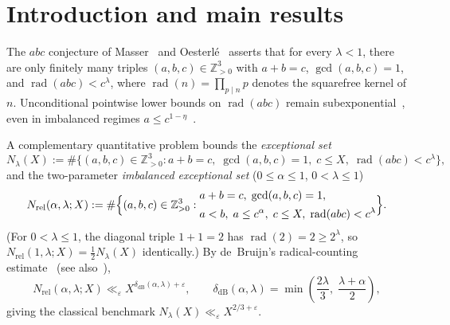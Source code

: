 \documentclass[11pt,a4paper]{amsart}
\theoremstyle{plain}
\theoremstyle{definition}
\theoremstyle{remark}
\DeclareMathOperator{\rad}{rad}
\newcommand{\Z}{\mathbb{Z}}
\newcommand{\eps}{\varepsilon}
\begin{document}
\begin{abstract}
\begin{enumerate}[label=(\arabic*),itemsep=1pt,topsep=2pt]
\[
  N_\lambda(X) \ll_\eps X^{4224/7637 + \eps} \qquad (4224/7637 = 0.553096\ldots).
\]
\end{enumerate}
Finally, we exhibit the exact zero-tail primal extremizer $a_1 a_5^5 + b_1 b_4^4 = c_1 c_3^3 c_4^4$ attaining $4224/7637$ and show why overcoming its $B^1$ pointwise floor requires an averaged bilinear fourth-moment estimate.
\end{abstract}

\maketitle

\section{Introduction and main results}\label{sec:intro}

The $abc$ conjecture of Masser~\cite{Masser1985} and Oesterl\'e~\cite{Oesterle1988} asserts that for every $\lambda < 1$, there are only finitely many triples $(a,b,c) \in \Z_{>0}^3$ with $a+b=c$, $\gcd(a,b,c)=1$, and $\rad(abc) < c^\lambda$, where $\rad(n) = \prod_{p \mid n} p$ denotes the squarefree kernel of $n$. Unconditional pointwise lower bounds on $\rad(abc)$ remain subexponential~\cite{StewartYu2001}, even in imbalanced regimes $a \le c^{1-\eta}$~\cite{Pasten2024}.

A complementary quantitative problem bounds the \emph{exceptional set}
\begin{equation}\label{eq:Nlam}
  N_\lambda(X) := \#\bigl\{(a,b,c) \in \Z_{>0}^3 : a+b=c,\; \gcd(a,b,c)=1,\; c \le X,\; \rad(abc) < c^\lambda\bigr\},
\end{equation}
and the two-parameter \emph{imbalanced exceptional set} ($0 \le \alpha \le 1$, $0 < \lambda \le 1$)
\begin{equation}\label{eq:Nrel}
  N_{\mathrm{rel}}(\alpha,\lambda;X) := \#\Bigl\{(a,b,c) \in \Z_{>0}^3 :
  \begin{aligned}
    &a+b=c,\; \gcd(a,b,c)=1, \\
    &a < b,\; a \le c^\alpha,\; c \le X,\; \rad(abc) < c^\lambda
  \end{aligned}
  \Bigr\}.
\end{equation}
(For $0 < \lambda \le 1$, the diagonal triple $1+1=2$ has $\rad(2) = 2 \ge 2^\lambda$, so $N_{\mathrm{rel}}(1,\lambda;X) = \frac{1}{2} N_\lambda(X)$ identically.) By de~Bruijn's radical-counting estimate~\cite{deBruijn1962} (see also~\cite{Lichtman2025}),
\[
  N_{\mathrm{rel}}(\alpha,\lambda;X) \ll_\eps X^{\delta_{\mathrm{dB}}(\alpha,\lambda)+\eps}, \qquad
  \delta_{\mathrm{dB}}(\alpha,\lambda) = \min\!\left(\frac{2\lambda}{3},\; \frac{\lambda+\alpha}{2}\right),
\]
giving the classical benchmark $N_\lambda(X) \ll_\eps X^{2/3+\eps}$.
\end{document}
